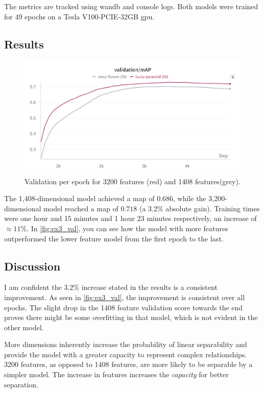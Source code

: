 The metrics are tracked using \acrlong{wandb} and console logs.
Both models were trained for 49 epochs on a Tesla V100-PCIE-32GB \acrshort{gpu}.

\subsection{Results}
\label{ssec:ex3_results}

\begin{figure}
    \centering
    \includegraphics[width=0.75\linewidth]{figures/1408_3200_val.png}
    \caption{Validation per epoch for 3200 features (red) and 1408 features(grey). }
    \label{fig:ex3_val}
\end{figure}
The 1,408-dimensional model achieved a  \acrshort{map} of \(0.686\), while the 3,200-dimensional model reached a \acrshort{map} of \(0.718\) (a 3.2\% absolute gain). Training times were one hour and 15 minutes and 1 hour 23 minutes respectively, an increase of \(\approx11\%\). In \autoref{fig:ex3_val}, you can see how the model with more features outperformed the lower feature model from the first epoch to the last. 


\subsection{Discussion}
\label{ssec:ex3_discussion}

I am confident the $3.2\%$ increase stated in the results is a consistent improvement. As seen in \autoref{fig:ex3_val}, the improvement is consistent over all epochs. The slight drop in the 1408 feature validation score towards the end proves there might be some overfitting in that model, which is not evident in the other model. 

More dimensions inherently increase the probability of linear separability and provide the model with a greater capacity to represent complex relationships. 3200 features, as opposed to 1408 features, are more likely to be separable by a simpler model. The increase in features increases the \textit{capacity} for better separation. 

